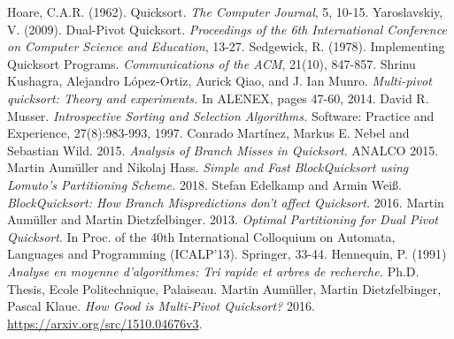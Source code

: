 \documentclass{article}
\begin{document}
\begin{thebibliography}{99}

 \label{HoareQuickSort} Hoare, C.A.R. (1962). Quicksort. \textit{The Computer Journal}, 5, 10-15.
 \label{Yaroslavskiy} Yaroslavskiy, V. (2009). Dual-Pivot Quicksort. \textit{Proceedings of the 6th International Conference on Computer Science and Education}, 13-27.
 \label{Sedgewick} Sedgewick, R. (1978). Implementing Quicksort Programs. \textit{Communications of the ACM}, 21(10), 847-857.
 \label{Kushagra} Shrinu Kushagra, Alejandro López-Ortiz, Aurick Qiao, and J. Ian Munro. \textit{Multi-pivot quicksort: Theory and experiments.} In ALENEX, pages 47-60, 2014.
 \label{Introsort} David R. Musser. \textit{Introspective Sorting and Selection Algorithms.} Software: Practice and Experience, 27(8):983-993, 1997.
 \label{AnalysisOfBranchMissesInQuickSort} Conrado Martínez, Markus E. Nebel and Sebastian Wild. 2015. \textit{Analysis of Branch Misses in Quicksort}. ANALCO 2015.
 \label{BlockQuickSortLomuto} Martin Aumüller and Nikolaj Hass. \textit{Simple and Fast BlockQuicksort using Lomuto's Partitioning Scheme.} 2018.
 \label{BlockQuickSort} Stefan Edelkamp and Armin Weiß. \textit{BlockQuicksort: How Branch Mispredictions don't affect Quicksort.} 2016.
 \label{OptimalPartitioningForDualPivotQuicksort} Martin Aumüller and Martin Dietzfelbinger. 2013. \textit{Optimal Partitioning for Dual Pivot Quicksort}. In Proc.
of the 40th International Colloquium on Automata, Languages and Programming (ICALP'13). Springer, 33-44.
 \label{Hennequin} Hennequin, P. (1991) \textit{Analyse en moyenne d'algorithmes: Tri rapide et arbres de recherche.} Ph.D. Thesis, Ecole Politechnique, Palaiseau.
 \label{HowGoodIsMultiPivotQuicksort} Martin Aumüller, Martin Dietzfelbinger, Pascal Klaue. \textit{How Good is Multi-Pivot Quicksort?} 2016. \url{https://arxiv.org/src/1510.04676v3}.
\end{thebibliography}
\end{document}
